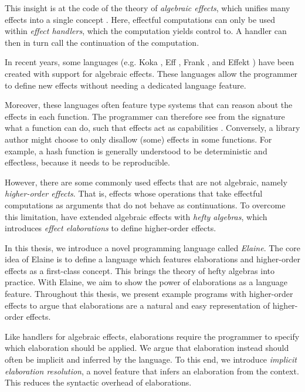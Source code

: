 This insight is at the code of the theory of \emph{algebraic effects}, which unifies many effects into a single concept \autocite{goos_adequacy_2001,castagna_handlers_2009}. Here, effectful computations can only be used within \emph{effect handlers}, which the computation yields control to. A handler can then in turn call the continuation of the computation.

In recent years, some languages (e.g. Koka \autocite{leijen_koka_2014}, Eff \autocite{bauer_programming_2015}, Frank \autocite{lindley_be_2017}, and Effekt \autocite{brachthauser_effects_2020}) have been created with support for algebraic effects. These languages allow the programmer to define new effects without needing a dedicated language feature.

Moreover, these languages often feature type systems that can reason about the effects in each function. The programmer can therefore see from the signature what a function can do, such that effects act as capabilities \autocite{brachthauser_effects_2020}. Conversely, a library author might choose to only disallow (some) effects in some functions. For example, a hash function is generally understood to be deterministic and effectless, because it needs to be reproducible.

However, there are some commonly used effects that are not algebraic, namely \emph{higher-order effects}. That is, effects whose operations that take effectful computations as arguments that do not behave as continuations. To overcome this limitation, \textcite{bach_poulsen_hefty_2023} have extended algebraic effects with \emph{hefty algebras}, which introduces \emph{effect elaborations} to define higher-order effects.

In this thesis, we introduce a novel programming language called \emph{Elaine}. The core idea of Elaine is to define a language which features elaborations and higher-order effects as a first-class concept. This brings the theory of hefty algebras into practice. With Elaine, we aim to show the power of elaborations as a language feature. Throughout this thesis, we present example programs with higher-order effects to argue that elaborations are a natural and easy representation of higher-order effects.

Like handlers for algebraic effects, elaborations require the programmer to specify which elaboration should be applied. We argue that elaboration instead should often be implicit and inferred by the language. To this end, we introduce \emph{implicit elaboration resolution}, a novel feature that infers an elaboration from the context. This reduces the syntactic overhead of elaborations.

